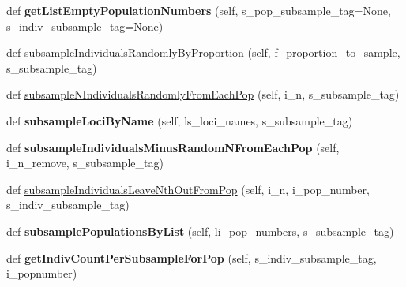\begin{DoxyCompactItemize}
\item 
def {\bfseries get\+List\+Empty\+Population\+Numbers} (self, s\+\_\+pop\+\_\+subsample\+\_\+tag=None, s\+\_\+indiv\+\_\+subsample\+\_\+tag=None)\hypertarget{classnegui_1_1genepopfilemanager_1_1GenepopFileManager_a05c943d32cf60349e9430ab9bd53e7d2}{}\label{classnegui_1_1genepopfilemanager_1_1GenepopFileManager_a05c943d32cf60349e9430ab9bd53e7d2}

\item 
def \hyperlink{classnegui_1_1genepopfilemanager_1_1GenepopFileManager_a5c85ac4838fd6919be1c408bcd39f54e}{subsample\+Individuals\+Randomly\+By\+Proportion} (self, f\+\_\+proportion\+\_\+to\+\_\+sample, s\+\_\+subsample\+\_\+tag)
\item 
def \hyperlink{classnegui_1_1genepopfilemanager_1_1GenepopFileManager_affaeb9457d84736dc1f289d600808f56}{subsample\+N\+Individuals\+Randomly\+From\+Each\+Pop} (self, i\+\_\+n, s\+\_\+subsample\+\_\+tag)
\item 
def {\bfseries subsample\+Loci\+By\+Name} (self, ls\+\_\+loci\+\_\+names, s\+\_\+subsample\+\_\+tag)\hypertarget{classnegui_1_1genepopfilemanager_1_1GenepopFileManager_afa08aba8e7a78951a6c0583aac52c9af}{}\label{classnegui_1_1genepopfilemanager_1_1GenepopFileManager_afa08aba8e7a78951a6c0583aac52c9af}

\item 
def {\bfseries subsample\+Individuals\+Minus\+Random\+N\+From\+Each\+Pop} (self, i\+\_\+n\+\_\+remove, s\+\_\+subsample\+\_\+tag)\hypertarget{classnegui_1_1genepopfilemanager_1_1GenepopFileManager_a97b12689980e0d6ce31c5882af1fd4e3}{}\label{classnegui_1_1genepopfilemanager_1_1GenepopFileManager_a97b12689980e0d6ce31c5882af1fd4e3}

\item 
def \hyperlink{classnegui_1_1genepopfilemanager_1_1GenepopFileManager_afb85a943b15c9a259510cc7f61b085b3}{subsample\+Individuals\+Leave\+Nth\+Out\+From\+Pop} (self, i\+\_\+n, i\+\_\+pop\+\_\+number, s\+\_\+indiv\+\_\+subsample\+\_\+tag)
\item 
def {\bfseries subsample\+Populations\+By\+List} (self, li\+\_\+pop\+\_\+numbers, s\+\_\+subsample\+\_\+tag)\hypertarget{classnegui_1_1genepopfilemanager_1_1GenepopFileManager_aab1109500d95ec010b4c39f198bb41c9}{}\label{classnegui_1_1genepopfilemanager_1_1GenepopFileManager_aab1109500d95ec010b4c39f198bb41c9}

\item 
def {\bfseries get\+Indiv\+Count\+Per\+Subsample\+For\+Pop} (self, s\+\_\+indiv\+\_\+subsample\+\_\+tag, i\+\_\+popnumber)\hypertarget{classnegui_1_1genepopfilemanager_1_1GenepopFileManager_aea153fd39e754a40d1c94a3fe765326c}{}\label{classnegui_1_1genepopfilemanager_1_1GenepopFileManager_aea153fd39e754a40d1c94a3fe765326c}


\end{DoxyCompactItemize}

